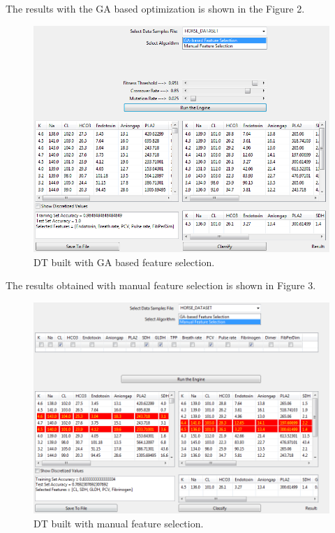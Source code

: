 \documentclass[conference]{IEEEtran}
\begin{document}
The results with the GA based optimization is shown in the Figure 2.
\begin{figure}[h!]
  
  \centering
    \includegraphics[scale=0.4]{ga_algo_stats.png}
\caption{DT built with GA based feature selection.}
\end{figure}

The results obtained with manual feature selection is shown in Figure 3.
\begin{figure}[h!]
  
  \centering
    \includegraphics[scale=0.3]{manual_sel_stats.png}
\caption{DT built with manual feature selection.}
\end{figure}
\end{document}
